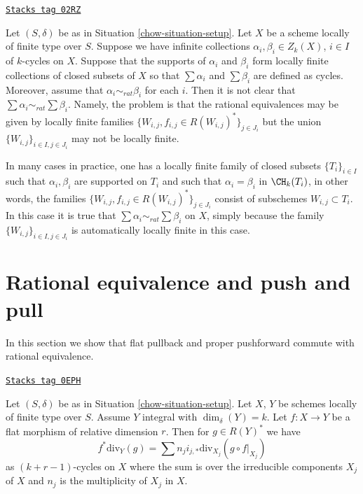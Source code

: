 \begin{remark}
\label{chow-remark-infinite-sums-rational-equivalences}
\href{https://stacks.math.columbia.edu/tag/02RZ}{\texttt{Stacks tag 02RZ}}

Let $(S, \delta)$ be as in Situation \ref{chow-situation-setup}.
Let $X$ be a scheme locally of finite type over $S$.
Suppose we have infinite collections $\alpha_i, \beta_i \in Z_k(X)$,
$i \in I$ of $k$-cycles on $X$. Suppose that the supports
of $\alpha_i$ and $\beta_i$ form locally finite collections
of closed subsets of $X$ so that $\sum \alpha_i$
and $\sum \beta_i$ are defined as cycles. Moreover, assume that
$\alpha_i \sim_{rat} \beta_i$ for each $i$. Then it is not
clear that $\sum \alpha_i \sim_{rat} \sum \beta_i$. Namely,
the problem is that the rational equivalences may be
given by locally finite
families $\{W_{i, j}, f_{i, j} \in R(W_{i, j})^*\}_{j \in J_i}$
but the union $\{W_{i, j}\}_{i \in I, j\in J_i}$ may not
be locally finite.

\medskip\noindent
In many cases in practice, one has a locally finite family of closed
subsets $\{T_i\}_{i \in I}$ such that $\alpha_i, \beta_i$
are supported on $T_i$ and such that $\alpha_i = \beta_i$
in $\CH_k(T_i)$, in other words, the families
$\{W_{i, j}, f_{i, j} \in R(W_{i, j})^*\}_{j \in J_i}$
consist of subschemes $W_{i, j} \subset T_i$. In this case it is true that
$\sum \alpha_i \sim_{rat} \sum \beta_i$ on $X$, simply because
the family $\{W_{i, j}\}_{i \in I, j\in J_i}$ is automatically
locally finite in this case.
\end{remark}

\section{Rational equivalence and push and pull}
\label{chow-section-properties-rational-equivalence}
In this section we show that flat pullback and proper pushforward
commute with rational equivalence.

\begin{lemma}
\label{chow-lemma-prepare-flat-pullback-rational-equivalence}
\href{https://stacks.math.columbia.edu/tag/0EPH}{\texttt{Stacks tag 0EPH}}

Let $(S, \delta)$ be as in Situation \ref{chow-situation-setup}.
Let $X$, $Y$ be schemes locally of finite type over $S$.
Assume $Y$ integral with $\dim_\delta(Y) = k$.
Let $f : X \to Y$ be a flat morphism of
relative dimension $r$. Then for $g \in R(Y)^*$ we have
$$
f^*\text{div}_Y(g) =
\sum n_j i_{j, *}\text{div}_{X_j}(g \circ f|_{X_j})
$$
as $(k + r - 1)$-cycles on $X$ where the sum is over the irreducible
components $X_j$ of $X$ and $n_j$ is the multiplicity of $X_j$ in $X$.
\end{lemma}

